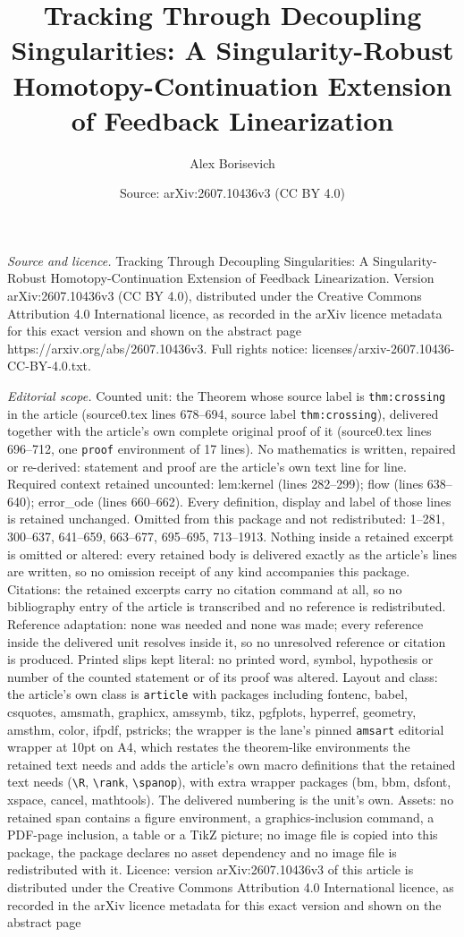 \documentclass[10pt,a4paper]{amsart}
\title[Tracking Through Decoupling Singularities: A Singularity-Rob]{Tracking Through Decoupling Singularities: A Singularity-Robust Homotopy-Continuation Extension of Feedback Linearization}
\author{Alex Borisevich}
\date{Source: arXiv:2607.10436v3 (CC BY 4.0)}
\begin{document}
\maketitle

\noindent\emph{Source and licence.} Tracking Through Decoupling Singularities: A Singularity-Robust Homotopy-Continuation Extension of Feedback Linearization. Version arXiv:2607.10436v3 (CC BY 4.0), distributed under the Creative Commons Attribution 4.0 International licence, as recorded in the arXiv licence metadata for this exact version and shown on the abstract page https://arxiv.org/abs/2607.10436v3. Full rights notice: licenses/arxiv-2607.10436-CC-BY-4.0.txt.\par\smallskip

\noindent\textit{Editorial scope.} Counted unit: the Theorem whose source label is \texttt{thm:crossing} in the article (source0.tex lines 678--694, source label \texttt{thm:crossing}), delivered together with the article's own complete original proof of it (source0.tex lines 696--712, one \texttt{proof} environment of 17 lines). No mathematics is written, repaired or re-derived: statement and proof are the article's own text line for line. Required context retained uncounted: lem:kernel (lines 282--299); flow (lines 638--640); error\_ode (lines 660--662). Every definition, display and label of those lines is retained unchanged. Omitted from this package and not redistributed: 1--281, 300--637, 641--659, 663--677, 695--695, 713--1913. Nothing inside a retained excerpt is omitted or altered: every retained body is delivered exactly as the article's lines are written, so no omission receipt of any kind accompanies this package. Citations: the retained excerpts carry no citation command at all, so no bibliography entry of the article is transcribed and no reference is redistributed. Reference adaptation: none was needed and none was made; every reference inside the delivered unit resolves inside it, so no unresolved reference or citation is produced. Printed slips kept literal: no printed word, symbol, hypothesis or number of the counted statement or of its proof was altered. Layout and class: the article's own class is \texttt{article} with packages including fontenc, babel, csquotes, amsmath, graphicx, amssymb, tikz, pgfplots, hyperref, geometry, amsthm, color, ifpdf, pstricks; the wrapper is the lane's pinned \texttt{amsart} editorial wrapper at 10pt on A4, which restates the theorem-like environments the retained text needs and adds the article's own macro definitions that the retained text needs (\texttt{\textbackslash R}, \texttt{\textbackslash rank}, \texttt{\textbackslash spanop}), with extra wrapper packages (bm, bbm, dsfont, xspace, cancel, mathtools). The delivered numbering is the unit's own. Assets: no retained span contains a figure environment, a graphics-inclusion command, a PDF-page inclusion, a table or a TikZ picture; no image file is copied into this package, the package declares no asset dependency and no image file is redistributed with it. Licence: version arXiv:2607.10436v3 of this article is distributed under the Creative Commons Attribution 4.0 International licence, as recorded in the arXiv licence metadata for this exact version and shown on the abstract page 
\end{document}
